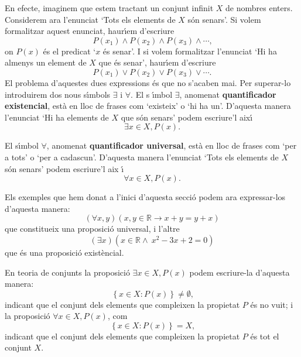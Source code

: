 En efecte, imaginem que estem tractant un conjunt infinit $X$ de nombres
enters. Considerem ara l'enunciat `Tots els elements de $X$ s\'{o}n senars'.
Si volem formalitzar aquest enunciat, haur\'{\i}em d'escriure%
\begin{equation*}
P(x_{1})\wedge P(x_{2})\wedge P(x_{3})\wedge\cdots\text{,}
\end{equation*}
on $P(x)$ \'{e}s el predicat `$x$ \'{e}s senar'. I si volem formalitzar
l'enunciat `Hi ha almenys un element de $X$ que \'{e}s senar', haur\'{\i}em
d'escriure%
\begin{equation*}
P(x_{1})\vee P(x_{2})\vee P(x_{3})\vee\cdots\text{.}
\end{equation*}
El problema d'aquestes dues expressions \'{e}s que no s'acaben mai. Per
superar-lo introduirem dos nous s\'{\i}mbols $\exists$ i $\forall$. El s%
\'{\i}mbol $\exists$, anomenat \textbf{quantificador existencial}, est\`{a}
en lloc de frases com `existeix' o `hi ha un'. D'aquesta manera l'enunciat
`Hi ha elements de $X$ que s\'{o}n senars' podem escriure'l aix\'{\i}%
\begin{equation*}
\exists x\in X,P(x)\text{.}
\end{equation*}

El s\'{\i}mbol $\forall$, anomenat \textbf{quantificador universal}, est\`{a}
en lloc de frases com `per a tots' o `per a cadascun'. D'aquesta manera
l'enunciat `Tots els elements de $X$ s\'{o}n senars' podem escriure'l aix%
\'{\i}%
\begin{equation*}
\forall x\in X,P(x)\text{.}
\end{equation*}

\bigskip

Els exemples que hem donat a l'inici d'aquesta secci\'{o} podem ara
expressar-los d'aquesta manera:
\begin{equation*}
\left( \forall x,y\right) \left( x,y\in\mathbb{R}\longrightarrow
x+y=y+x\right)
\end{equation*}
que constitueix una proposici\'{o} universal, i l'altre%
\begin{equation*}
\left( \exists x\right) \left( x\in\mathbb{R\wedge~}x^{2}-3x+2=0\right)
\end{equation*}
que \'{e}s una proposici\'{o} exist\`{e}ncial.

\begin{observacio}
En teoria de conjunts la proposici\'{o} $\exists x\in X,P(x)$ podem
escriure-la d'aquesta manera:%
\begin{equation*}
\left\{ x\in X:P(x)\right\} \neq\emptyset\text{,}
\end{equation*}
indicant que el conjunt dels elements que compleixen la propietat $P$ \'{e}s
no vuit; i la proposici\'{o} $\forall x\in X,P(x)$, com%
\begin{equation*}
\left\{ x\in X:P(x)\right\} =X\text{,}
\end{equation*}
indicant que el conjunt dels elements que compleixen la propietat $P$ \'{e}s
tot el conjunt $X$.
\end{observacio}

